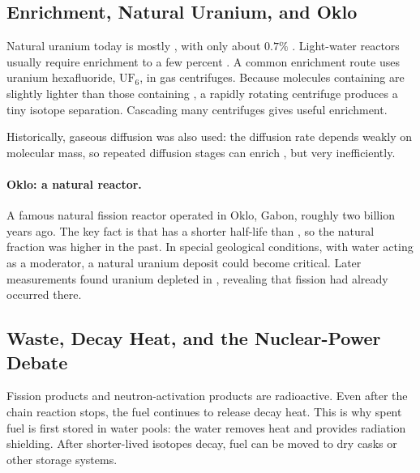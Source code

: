 \subsection{Enrichment, Natural Uranium, and Oklo}
\label{subsec:lec11:enrichment_oklo}

Natural uranium today is mostly , with only about
$0.7\%$ . Light-water reactors usually require enrichment to a
few percent . A common enrichment route uses uranium hexafluoride,
$\mathrm{UF_6}$, in gas centrifuges. Because molecules containing
 are slightly lighter than those containing , a
rapidly rotating centrifuge produces a tiny isotope separation. Cascading many
centrifuges gives useful enrichment.

Historically, gaseous diffusion was also used: the diffusion rate depends weakly
on molecular mass, so repeated diffusion stages can enrich , but
very inefficiently.

\paragraph{Oklo: a natural reactor.}
A famous natural fission reactor operated in Oklo, Gabon, roughly two billion
years ago. The key fact is that  has a shorter half-life than
, so the natural  fraction was higher in the
past. In special geological conditions, with water acting as a moderator, a
natural uranium deposit could become critical. Later measurements found uranium
depleted in , revealing that fission had already occurred there.

\subsection{Waste, Decay Heat, and the Nuclear-Power Debate}
\label{subsec:lec11:waste}

Fission products and neutron-activation products are radioactive. Even after the
chain reaction stops, the fuel continues to release decay heat. This is why spent
fuel is first stored in water pools: the water removes heat and provides
radiation shielding. After shorter-lived isotopes decay, fuel can be moved to dry
casks or other storage systems.

